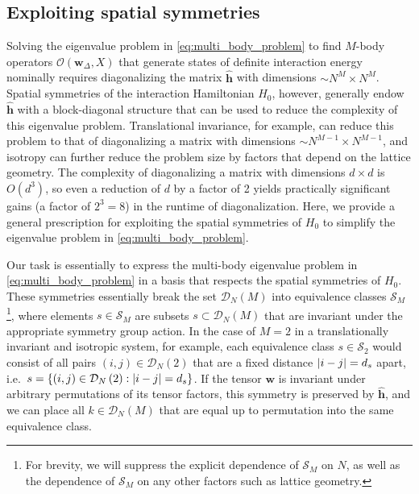 \documentclass[nofootinbib,notitlepage,11pt]{revtex4-2}
\newcommand{\p}[1]{\left(#1\right)} %
\renewcommand{\set}[1]{\left\{#1\right\}} %
\newcommand{\m}{\bm} %
\newcommand{\1}{\mathds{1}}
\newcommand{\D}{\mathcal{D}}
\renewcommand{\O}{\mathcal{O}}
\renewcommand{\S}{\mathcal{S}}
\begin{document}
\subsection{Exploiting spatial symmetries}
\label{sec:symmetries}

Solving the eigenvalue problem in \eqref{eq:multi_body_problem} to
find $M$-body operators $\O\p{\m w_\Delta,X}$ that generate states of
definite interaction energy nominally requires diagonalizing the
matrix $\hat{\m h}$ with dimensions $\sim N^M\times N^M$.  Spatial
symmetries of the interaction Hamiltonian $H_0$, however, generally
endow $\hat{\m h}$ with a block-diagonal structure that can be used to
reduce the complexity of this eigenvalue problem.  Translational
invariance, for example, can reduce this problem to that of
diagonalizing a matrix with dimensions $\sim N^{M-1}\times N^{M-1}$,
and isotropy can further reduce the problem size by factors that
depend on the lattice geometry.  The complexity of diagonalizing a
matrix with dimensions $d\times d$ is $O\p{d^3}$, so even a reduction
of $d$ by a factor of 2 yields practically significant gains (a factor
of $2^3=8$) in the runtime of diagonalization.  Here, we provide a
general prescription for exploiting the spatial symmetries of $H_0$ to
simplify the eigenvalue problem in \eqref{eq:multi_body_problem}.

Our task is essentially to express the multi-body eigenvalue problem
in \eqref{eq:multi_body_problem} in a basis that respects the spatial
symmetries of $H_0$.  These symmetries essentially break the set
$\D_N\p{M}$ into equivalence classes $\S_M$\footnote{For brevity, we
  will suppress the explicit dependence of $\S_M$ on $N$, as well as
  the dependence of $\S_M$ on any other factors such as lattice
  geometry.}, where elements $s\in\S_M$ are subsets
$s\subset\D_N\p{M}$ that are invariant under the appropriate symmetry
group action.  In the case of $M=2$ in a translationally invariant and
isotropic system, for example, each equivalence class $s\in\S_2$ would
consist of all pairs $\p{i,j}\in\D_N\p{2}$ that are a fixed distance
$\abs{i-j}=d_s$ apart,
i.e.~$s=\set{\p{i,j}\in\D_N\p{2}:\abs{i-j}=d_s}$.  If the tensor
$\m w$ is invariant under arbitrary permutations of its tensor
factors, this symmetry is preserved by $\hat{\m h}$, and we can place
all $k\in\D_N\p{M}$ that are equal up to permutation into the same
equivalence class.
\end{document}
